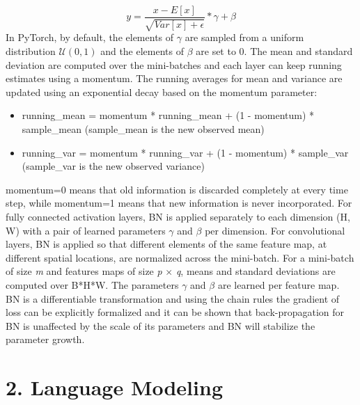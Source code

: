 \documentclass[11pt]{article}
\newcommand{\0}{\mat{0}}
\begin{document}
\begin{itemize}
    	\[
    		y =\frac{x-E[x]} {\sqrt{Var[x]+\epsilon}} * \gamma + \beta
    	\]
	In PyTorch,  by default, the elements of $\gamma$ are sampled from a uniform distribution $\mathcal{U}(0,1)$ and the elements of $\beta$ are set to 0. The mean and standard deviation are computed over the mini-batches and each layer can keep running estimates using a momentum. The running averages for mean and variance are updated using an exponential decay based on the momentum parameter:
	\begin{itemize}
    		\item running\_mean = momentum * running\_mean + (1 - momentum) * sample\_mean (sample\_mean is the new observed mean)
    		\item running\_var = momentum * running\_var + (1 - momentum) * sample\_var (sample\_var is the new observed variance)
    	\end{itemize}   
	momentum=0 means that old information is discarded completely at every time step, while momentum=1 means that new information is never incorporated. For fully connected activation layers, BN is applied separately to each dimension (H, W) with a pair of learned parameters $\gamma$ and $\beta$ per dimension. For convolutional layers, BN is applied so that different elements of the same feature map, at different spatial locations, are normalized across the mini-batch. For a mini-batch of size \textit{m} and features maps of size \textit{p} $\times$ \textit{q}, means and standard deviations are computed over B*H*W. The parameters $\gamma$ and $\beta$ are learned per feature map. BN is a differentiable transformation and using the chain rules the gradient of loss can be explicitly formalized and it can be shown that back-propagation for BN is unaffected by the scale of its parameters and BN will stabilize the parameter growth. 
 \end{itemize}   
 
 \section*{2. Language Modeling}
 
\end{document}
